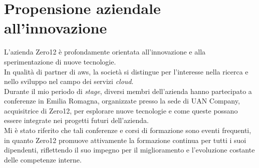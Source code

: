 \pagebreak
\section{Propensione aziendale all'innovazione}
\label{sez:propensione-a-innovazione}

L'azienda Zero12 è profondamente orientata all'innovazione e alla sperimentazione di nuove tecnologie.\\
In qualità di partner di \gls{aws}, la società si distingue per l'interesse nella ricerca e nello sviluppo nel campo dei servizi \textit{cloud}.\\ 

\noindent Durante il mio periodo di \textit{stage}, diversi membri dell'azienda hanno partecipato a conferenze in Emilia Romagna, organizzate presso la sede di UAN Company, acquisitrice di Zero12, per esplorare nuove tecnologie e come queste possano essere integrate nei progetti futuri dell'azienda.\\ 
Mi è stato riferito che tali conferenze e corsi di formazione sono eventi frequenti, in quanto Zero12 promuove attivamente la formazione continua per tutti i suoi dipendenti, riflettendo il suo impegno per il miglioramento e l'evoluzione costante delle competenze interne.

